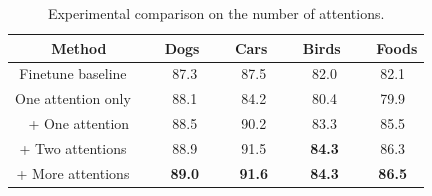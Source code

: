 \documentclass[10pt,twocolumn,letterpaper]{article}
\begin{document}



\begin{table}[t]
\centering
{}
\addtolength{\tabcolsep}{2.5pt}
\begin{tabular}{c c c c c}
\toprule[0.2 em]
Method & \ Dogs \ & \ Cars \ & \ Birds \ & \ Foods \\
\toprule[0.2 em]
Finetune baseline \ & 87.3 & 87.5 & 82.0 & 82.1\\
One attention only \ & 88.1& 84.2 & 80.4 & 79.9 \\
+ One attention & 88.5 & 90.2 & 83.3 & 85.5 \\
+ Two attentions  \ & 88.9 & 91.5 & {\bf84.3} & 86.3 \\
+ More attentions \ & {\bf 89.0} & {\bf 91.6} & {\bf 84.3} & {\bf 86.5} \\
\bottomrule[0.1 em]
\end{tabular}
\vspace{1pt}
\caption{Experimental comparison on the number of attentions.}
\label{tab:number_of_attention}
\end{table}
\end{document}

